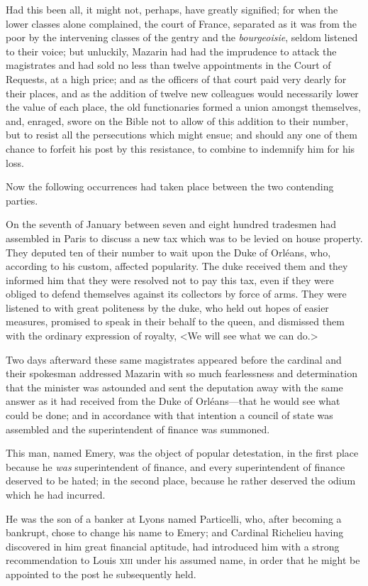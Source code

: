 Had this been all, it might not, perhaps, have greatly signified; for when the lower classes alone complained, the court of France, separated as it was from the poor by the intervening classes of the gentry and the \textit{bourgeoisie}, seldom listened to their voice; but unluckily, Mazarin had had the imprudence to attack the magistrates and had sold no less than twelve appointments in the Court of Requests, at a high price; and as the officers of that court paid very dearly for their places, and as the addition of twelve new colleagues would necessarily lower the value of each place, the old functionaries formed a union amongst themselves, and, enraged, swore on the Bible not to allow of this addition to their number, but to resist all the persecutions which might ensue; and should any one of them chance to forfeit his post by this resistance, to combine to indemnify him for his loss.

Now the following occurrences had taken place between the two contending parties.

On the seventh of January between seven and eight hundred tradesmen had assembled in Paris to discuss a new tax which was to be levied on house property. They deputed ten of their number to wait upon the Duke of Orléans, who, according to his custom, affected popularity. The duke received them and they informed him that they were resolved not to pay this tax, even if they were obliged to defend themselves against its collectors by force of arms. They were listened to with great politeness by the duke, who held out hopes of easier measures, promised to speak in their behalf to the queen, and dismissed them with the ordinary expression of royalty, <We will see what we can do.>

Two days afterward these same magistrates appeared before the cardinal and their spokesman addressed Mazarin with so much fearlessness and determination that the minister was astounded and sent the deputation away with the same answer as it had received from the Duke of Orléans—that he would see what could be done; and in accordance with that intention a council of state was assembled and the superintendent of finance was summoned.

This man, named Emery, was the object of popular detestation, in the first place because he \textit{was} superintendent of finance, and every superintendent of finance deserved to be hated; in the second place, because he rather deserved the odium which he had incurred.

He was the son of a banker at Lyons named Particelli, who, after becoming a bankrupt, chose to change his name to Emery; and Cardinal Richelieu having discovered in him great financial aptitude, had introduced him with a strong recommendation to Louis \textsc{xiii} under his assumed name, in order that he might be appointed to the post he subsequently held.

